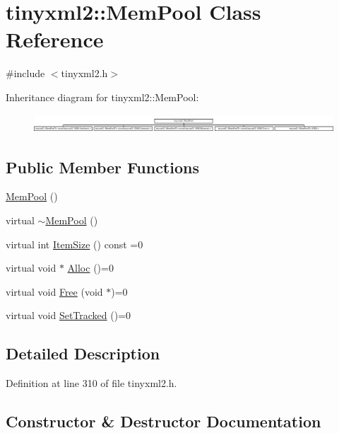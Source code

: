 \hypertarget{classtinyxml2_1_1_mem_pool}{}\section{tinyxml2\+:\+:Mem\+Pool Class Reference}
\label{classtinyxml2_1_1_mem_pool}


{\ttfamily \#include $<$tinyxml2.\+h$>$}

Inheritance diagram for tinyxml2\+:\+:Mem\+Pool\+:\begin{figure}[H]
\begin{center}
\leavevmode
\includegraphics[height=0.691358cm]{classtinyxml2_1_1_mem_pool}
\end{center}
\end{figure}
\subsection*{Public Member Functions}
\begin{DoxyCompactItemize}
\item 
\hyperlink{classtinyxml2_1_1_mem_pool_a9101a0083d7370c85bd5aaaba7157f84}{Mem\+Pool} ()
\item 
virtual \hyperlink{classtinyxml2_1_1_mem_pool_ae55ad9e3faeca702e6ccbb38fdbcad72}{$\sim$\+Mem\+Pool} ()
\item 
virtual int \hyperlink{classtinyxml2_1_1_mem_pool_a0c518d49e3a94bde566f61e13b7240bb}{Item\+Size} () const =0
\item 
virtual void $\ast$ \hyperlink{classtinyxml2_1_1_mem_pool_a4f977b5fed752c0bbfe5295f469d6449}{Alloc} ()=0
\item 
virtual void \hyperlink{classtinyxml2_1_1_mem_pool_a49e3bfac2cba2ebd6776b31e571f64f7}{Free} (void $\ast$)=0
\item 
virtual void \hyperlink{classtinyxml2_1_1_mem_pool_ac5804dd1387b2e4de5eef710076a0db1}{Set\+Tracked} ()=0
\end{DoxyCompactItemize}


\subsection{Detailed Description}


Definition at line 310 of file tinyxml2.\+h.



\subsection{Constructor \& Destructor Documentation}
\hypertarget{classtinyxml2_1_1_mem_pool_a9101a0083d7370c85bd5aaaba7157f84}{}
